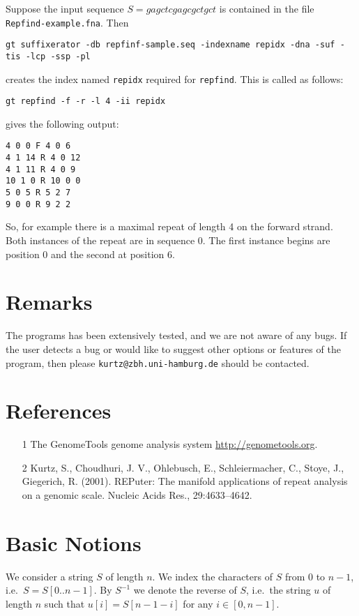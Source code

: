 \documentclass[12pt]{article}
\newcommand{\Repfind}[0]{\texttt{\small repfind}\xspace}
\newcommand{\Substring}[3]{#1[#2..#3]}
\newcommand{\Subchar}[2]{#1[#2]}
\begin{document}
Suppose the input sequence \(S=gagctcgagcgctgct\)
is contained in the file \texttt{Repfind-example.fna}. Then
\begin{footnotesize}
\begin{verbatim}
gt suffixerator -db repfinf-sample.seq -indexname repidx -dna -suf -tis -lcp -ssp -pl
\end{verbatim}
\end{footnotesize}
creates the index named \texttt{repidx} required for \Repfind. This is
called as follows:

\begin{verbatim}
gt repfind -f -r -l 4 -ii repidx
\end{verbatim}
gives the following output:
\begin{verbatim}
4 0 0 F 4 0 6
4 1 14 R 4 0 12
4 1 11 R 4 0 9
10 1 0 R 10 0 0
5 0 5 R 5 2 7
9 0 0 R 9 2 2
\end{verbatim}
So, for example there is a maximal repeat of length 4  on the forward strand.
Both instances of the repeat are in sequence 0. The first instance begins
are position 0 and the second at position 6.

\section{Remarks}
The programs has been extensively tested, and we are not aware of any bugs.
If the user detects a bug or would like to suggest other options or
features of the program, then please \texttt{kurtz@zbh.uni-hamburg.de}
should be contacted.

\section*{References}
\begin{enumerate}
\item[1]
The GenomeTools genome analysis system \url{http://genometools.org}.
\item[2]
Kurtz, S., Choudhuri, J. V., Ohlebusch, E., Schleiermacher, C., Stoye, J.,
Giegerich, R. (2001). REPuter: The manifold applications of repeat analysis on
a genomic scale. Nucleic Acids Res., 29:4633–4642.
\end{enumerate}

\appendix
\section{Basic Notions}\label{Basic}
We consider a string \(S\) of length \(n\). We index the characters of
\(S\) from \(0\) to \(n-1\), i.e.\ \(S=\Substring{S}{0}{n-1}\). By
\(S^{-1}\) we denote the reverse of \(S\), i.e.\ the string \(u\) of length
\(n\) such that \(\Subchar{u}{i}=\Subchar{S}{n-1-i}\) for
any \(i\in[0,n-1]\).
\end{document}
